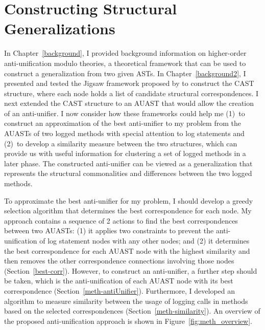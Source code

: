 \chapter{Constructing Structural Generalizations} \label{ch4} \label{methodology}

In Chapter~\ref{background}, I provided background information on higher-order anti-unification modulo theories, a theoretical framework that can be used to construct a generalization from two given ASTs. In Chapter~\ref{background2}, I presented and tested the Jigsaw framework proposed by \citet{2008:fse:cottrell} to construct the CAST structure, where each node holds a list of candidate structural correspondences. I next extended the CAST structure to an AUAST that would allow the creation of an anti-unifier. 
I now consider how these frameworks could help me (1)~to construct an approximation of the best anti-unifier to my problem from the AUASTs of two logged methods with special attention to log statements and (2)~to develop a similarity measure between the two structures, which can provide us with useful information for clustering a set of logged methods in a later phase. The constructed anti-unifier can be viewed as a generalization that represents the structural commonalities and differences between the two logged methods.




To approximate the best anti-unifier for my problem, I should develop a greedy selection algorithm that determines the best correspondence for each node. My approach contains a sequence of 2 actions to find the best correspondences between two AUASTs: (1) it applies two constraints to prevent the anti-unification of log statement nodes with any other nodes; and (2) it determines the best correspondence for each AUAST node with the highest similarity and then removes the other correspondence connections involving those nodes (Section~\ref{best-corr}). However, to construct an anti-unifier, a further step should be taken, which is the anti-unification of each AUAST node with its best correspondence (Section~\ref{meth-antiUnifier}). Furthermore, I developed an algorithm to measure similarity between the usage of logging calls in methods based on the selected correspondences (Section~\ref{meth-similarity}). An overview of the proposed anti-unification approach is shown in Figure~\ref{fig:meth_overview}.





